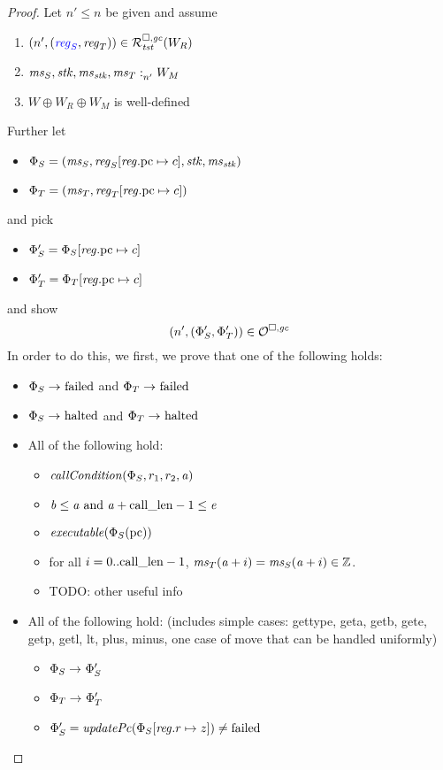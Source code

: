 \begin{proof}
Let $n' \leq n$ be given and assume
\begin{enumerate}
\item $\npair[n']{\stpair{\reg}{\reg}} \in \lrrg{\trust}(W_R)$ \label{item:reg-ass}
\item $\memSat[n']{\ms_S,\stk,\ms_\stk,\ms_T}{W_M}$\label{item:mem-ass}
\item $W \oplus W_R \oplus W_M$ is well-defined\label{item:worlds-def}
\end{enumerate}
Further let
\begin{itemize}
\item $\Phi_S = (\ms_S,\reg_S\updReg{\pcreg}{c},\stk,\ms_\stk)$
\item $\Phi_T = (\ms_T,\reg_T\updReg{\pcreg}{c})$
\end{itemize}
and pick
\begin{itemize}
\item $\Phi_S' = \Phi_S\updReg{\pcreg}{c}$
\item $\Phi_T' = \Phi_T\updReg{\pcreg}{c}$
\end{itemize}
and show
\[
  \npair[n']{(\Phi_S',\Phi_T')} \in \lro
\]
In order to do this, we first, we prove that one of the following holds:
\begin{itemize}
\item $\Phi_S \step \failed$ and $\Phi_T \step\failed$
\item $\Phi_S \step \halted$ and $\Phi_T \step\halted$
\item All of the following hold:
  \begin{itemize}
  \item $\callCond{\Phi_S,r_1,r_2,\aaddr}$
  \item $\baddr \leq \aaddr \tand \aaddr + \calllen-1 \leq \eaddr$
  \item $\exec{\Phi_S(\pcreg)}$
  \item for all $i = 0..\calllen-1$, $\ms_T(\aaddr+i) = \ms_S(\aaddr+i) \in \ints$.
  \item TODO: other useful info
  \end{itemize}
\item All of the following hold: (includes simple cases: gettype, geta, getb,
  gete, getp, getl, lt, plus, minus, one case of move that can be handled uniformly)
  \begin{itemize}
  \item $\Phi_S \step \Phi_S'$
  \item $\Phi_T \step \Phi_T'$
  \item $\Phi_S' = \updPcAddr{\Phi_S\updReg{r}{z}} \neq \failed$

\end{itemize}
\end{itemize}
\end{proof}
